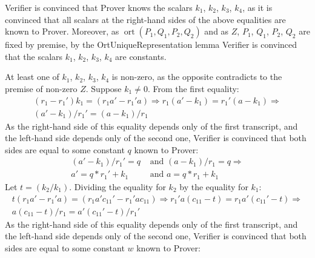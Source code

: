 \documentclass{mathcryptology} %
\DeclareMathOperator{\ort}{ort}
\theoremstyle{title}
\theoremstyle{titleof}
\renewenvironment{proof}{\noindent{\bfseries Proof:} }{}
\begin{document}
\begin{proof}
        Verifier is convinced that Prover knows the scalars $k_{1}$, $k_{2}$, $k_{3}$, $k_{4}$, as it is convinced that all scalars at the right-hand sides of the above equalities are known to Prover. Moreover, as $\ort\left(P_{1}, Q_{1}, P_{2}, Q_{2}\right)$ and as $Z$, $P_{1}$, $Q_{1}$, $P_{2}$, $Q_{2}$ are fixed by premise, by the OrtUniqueRepresentation lemma Verifier is convinced that the scalars $k_{1}$, $k_{2}$, $k_{3}$, $k_{4}$ are constants. 

        At least one of $k_{1}$, $k_{2}$, $k_{3}$, $k_{4}$ is non-zero, as the opposite contradicts to the premise of non-zero $Z$. Suppose $k_{1}\neq0$. From the first equality:
        \begin{gather*}
            \left(r_{1} - r_{1}'\right) k_{1} =
            \left(r_{1} a' - r_{1}'a\right) \Rightarrow
            r_{1} \left(a' - k_{1}\right) =
            r_{1}' \left(a - k_{1}\right) \Rightarrow \\
            \left(a' - k_{1}\right) / r_{1}' =
            \left(a - k_{1}\right)  / r_{1}
        \end{gather*}
        As the right-hand side of this equality depends only of the first transcript, and the left-hand side depends only of the second one, Verifier is convinced that both sides are equal to some constant $q$ known to Prover:
        \begin{align*}
            \left(a' - k_{1}\right) / r_{1}' = q
            & \text{ and }
            \left(a-k_{1}\right) / r_{1} = q \Rightarrow \\
            a' = q*r_{1}' + k_{1}
            & \text{ and }
            a=q*r_{1}+k_{1}\label{Eq:2ast}\tag{**}
        \end{align*}
        Let $t=\left(k_{2}/k_{1}\right)$. Dividing the equality for $k_{2}$ by the equality for $k_{1}$:
        \begin{gather*}
            t\left(r_{1} a' - r_{1}' a\right) =
            \left(r_{1} a' c_{11}' - r_{1}' a c_{11}\right) \Rightarrow
            r_{1}' a \left(c_{11} - t\right) =
            r_{1} a' \left(c_{11}' - t\right) \Rightarrow \\
            a\left(c_{11} -t\right) / r_{1} = a'\left(c_{11}' - t\right) / r_{1}'\label{Eq:3ast}\tag{***}
        \end{gather*}
        As the right-hand side of this equality depends only of the first transcript, and the left-hand
        side depends only of the second one, Verifier is convinced that both sides are equal to some constant $w$ known to Prover:

\end{proof}
\end{document}
